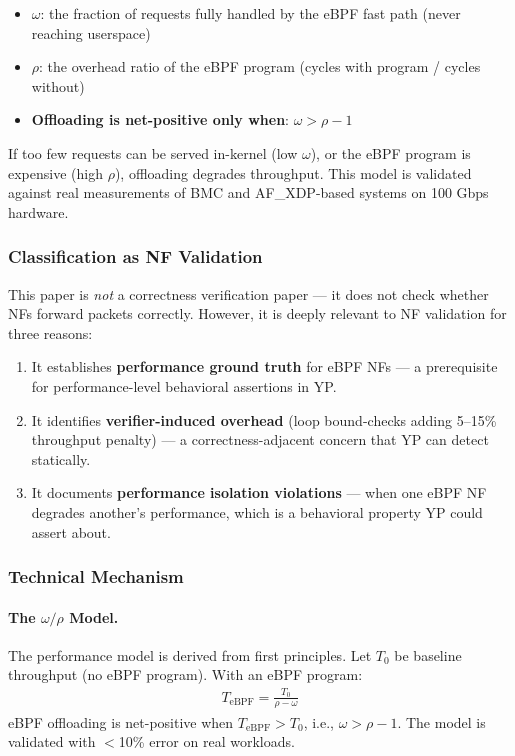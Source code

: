 \begin{itemize}
  \item $\omega$: the fraction of requests fully handled by the eBPF fast path (never reaching userspace)
  \item $\rho$: the overhead ratio of the eBPF program (cycles with program / cycles without)
  \item \textbf{Offloading is net-positive only when}: $\omega > \rho - 1$
\end{itemize}

If too few requests can be served in-kernel (low $\omega$), or the eBPF program is expensive (high $\rho$), offloading degrades throughput. This model is validated against real measurements of BMC and AF\_XDP-based systems on 100 Gbps hardware.

\subsubsection{Classification as NF Validation}

This paper is \emph{not} a correctness verification paper --- it does not check whether NFs forward packets correctly. However, it is deeply relevant to NF validation for three reasons:

\begin{enumerate}
  \item It establishes \textbf{performance ground truth} for eBPF NFs --- a prerequisite for performance-level behavioral assertions in YP.
  \item It identifies \textbf{verifier-induced overhead} (loop bound-checks adding 5--15\% throughput penalty) --- a correctness-adjacent concern that YP can detect statically.
  \item It documents \textbf{performance isolation violations} --- when one eBPF NF degrades another's performance, which is a behavioral property YP could assert about.
\end{enumerate}

\subsubsection{Technical Mechanism}

\paragraph{The $\omega/\rho$ Model.}
The performance model is derived from first principles. Let $T_0$ be baseline throughput (no eBPF program). With an eBPF program:
\begin{align}
  T_{\text{eBPF}} = \frac{T_0}{\rho - \omega}
\end{align}
eBPF offloading is net-positive when $T_{\text{eBPF}} > T_0$, i.e., $\omega > \rho - 1$. The model is validated with $<$10\% error on real workloads.

